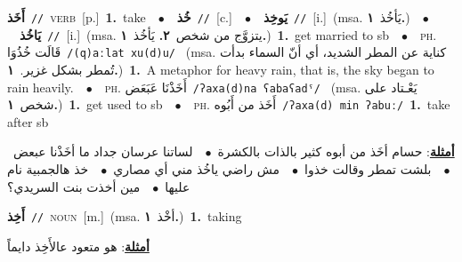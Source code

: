 \documentclass[10pt,a4paper,twoside]{article} %
\begin{document}
\begin{multicols}{2}
{\setlength\topsep{0pt}\textbf{\foreignlanguage{arabic}{أَخَذ}}\ {\color{gray}\texttt{//}\color{black}}\ \textsc{verb}\ [p.]\ \textbf{1.}~take\ \ $\bullet$\ \ \setlength\topsep{0pt}\textbf{\foreignlanguage{arabic}{خُذ}}\ {\color{gray}\texttt{//}\color{black}}\ [c.]\ \ $\bullet$\ \ \setlength\topsep{0pt}\textbf{\foreignlanguage{arabic}{يَوخِذ}}\ {\color{gray}\texttt{//}\color{black}}\ [i.]\ \color{gray}(msa. \foreignlanguage{arabic}{يَأخُذ}~\foreignlanguage{arabic}{\textbf{١.}})\color{black}\ \ $\bullet$\ \ \setlength\topsep{0pt}\textbf{\foreignlanguage{arabic}{يَاخُذ}}\ {\color{gray}\texttt{//}\color{black}}\ [i.]\ \color{gray}(msa. \foreignlanguage{arabic}{يتزوَّج من شخص}~\foreignlanguage{arabic}{\textbf{٢.}}  \foreignlanguage{arabic}{يَأخُذ}~\foreignlanguage{arabic}{\textbf{١.}})\color{black}\ \textbf{1.}~get married to sb\ \ $\bullet$\ \ \textsc{ph.} \color{gray} \foreignlanguage{arabic}{قَالَت خُذُوَا}\color{black}\ {\color{gray}\texttt{/{\sffamily (q)aːlat xu(d)u}/}\color{black}}\ \color{gray} (msa. \foreignlanguage{arabic}{كناية عن المطر الشديد، أي أنّ السماء بدأت تُمطر بشكل غزير.}~\foreignlanguage{arabic}{\textbf{١.}})\color{black}\ \textbf{1.}~A metaphor for heavy rain, that is, the sky began to rain heavily.\ \ $\bullet$\ \ \textsc{ph.} \color{gray} \foreignlanguage{arabic}{أَخَذْنَا عَبَعَض}\color{black}\ {\color{gray}\texttt{/{\sffamily ʔaxa(d)na ʕabaʕadˤ}/}\color{black}}\ \color{gray} (msa. \foreignlanguage{arabic}{يَعْـتاد على شخص}~\foreignlanguage{arabic}{\textbf{١.}})\color{black}\ \textbf{1.}~get used to sb\ \ $\bullet$\ \ \textsc{ph.} \color{gray} \foreignlanguage{arabic}{أَخَذ من أَبُوه}\color{black}\ {\color{gray}\texttt{/{\sffamily ʔaxa(d) min ʔabuː}/}\color{black}}\ \textbf{1.}~take after sb\  \begin{flushright}\color{gray}\foreignlanguage{arabic}{\textbf{\underline{\foreignlanguage{arabic}{أمثلة}}}: حسام أخَذ من أبوه كثير بالذات بالكشرة\ $\bullet$\ \  لساتنا عرسان جداد ما أخَذْنا عبعض\ $\bullet$\ \  بلشت تمطر وقالت خذوا\ $\bullet$\ \  مش راضي ياخُذ مني أي مصاري\ $\bullet$\ \  خذ هالجمبية نام عليها\ $\bullet$\ \  مين أخذت بنت السريدي؟}\end{flushright}\color{black}} \vspace{2mm}

{\setlength\topsep{0pt}\textbf{\foreignlanguage{arabic}{أَخِذ}}\ {\color{gray}\texttt{//}\color{black}}\ \textsc{noun}\ [m.]\ \color{gray}(msa. \foreignlanguage{arabic}{أخْذ}~\foreignlanguage{arabic}{\textbf{١.}})\color{black}\ \textbf{1.}~taking\  \begin{flushright}\color{gray}\foreignlanguage{arabic}{\textbf{\underline{\foreignlanguage{arabic}{أمثلة}}}: هو متعود عالأَخِذ دايماً}\end{flushright}\color{black}} \vspace{2mm}


\end{multicols}
\end{document}
